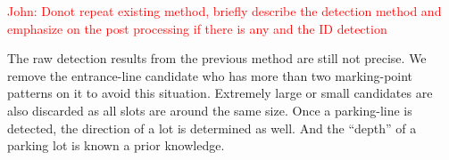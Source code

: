 \documentclass[journal]{IEEEtran}
\newcommand{\COMMENT}[1]{\textcolor{red}{#1}}
\begin{document}
\COMMENT{John: Donot repeat existing method, briefly describe the detection method and emphasize on the post processing if there is any and the ID detection}


%
%
The raw detection results from the previous method are still not precise. 
We remove the entrance-line candidate who has more than two marking-point patterns on it to avoid this situation.  
Extremely large or small candidates are also discarded as all slots are around the same size.
Once a parking-line is detected, the direction of a lot is determined as well. And the “depth” of a parking lot is known a prior knowledge. 
\end{document}
